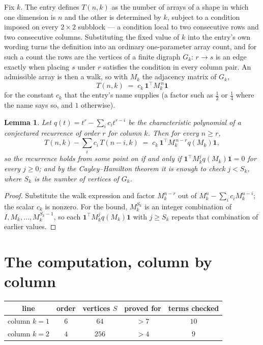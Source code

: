 \documentclass[11pt,a4paper]{article}
\theoremstyle{plain}
\newtheorem{lemma}[theorem]{Lemma}
\theoremstyle{definition}
\begin{document}
Fix $k$. The entry defines $T(n,k)$ as the number of arrays of a shape in which one dimension
is $n$ and the other is determined by $k$, subject to a condition imposed on every
$2\times2$ subblock --- a condition local to two consecutive rows and two consecutive columns.
Substituting the fixed value of $k$ into the entry's own wording turns the definition into an
ordinary one-parameter array count, and for such a count the rows are the vertices of a finite
digraph $G_k$: $r\to s$ is an edge exactly when placing $s$ under $r$ satisfies the condition
in every column pair. An admissible array is then a walk, so with $M_k$ the adjacency matrix
of $G_k$,
\[
T(n,k)\;=\;c_k\,\mathbf{1}^{\!\top}M_k^{\,n}\mathbf{1}
\]
for the constant $c_k$ that the entry's name supplies (a factor such as $\tfrac12$ or
$\tfrac14$ where the name says so, and $1$ otherwise).

\begin{lemma}\label{lem:crit}
Let $q(t)=t^{r}-\sum_i c_it^{r-i}$ be the characteristic polynomial of a conjectured
recurrence of order $r$ for column $k$. Then for every $n\ge r$,
\[
T(n,k)-\sum_i c_i\,T(n-i,k)\;=\;c_k\,\mathbf{1}^{\!\top}M_k^{\,n-r}q(M_k)\mathbf{1},
\]
so the recurrence holds from some point on if and only if
$\mathbf{1}^{\!\top}M_k^{j}q(M_k)\mathbf{1}=0$ for every $j\ge0$; and by the
Cayley--Hamilton theorem it is enough to check $j<S_k$, where $S_k$ is the number of vertices
of $G_k$.
\end{lemma}

\begin{proof}
Substitute the walk expression and factor $M_k^{n-r}$ out of $M_k^{n}-\sum_ic_iM_k^{n-i}$;
the scalar $c_k$ is nonzero. For the bound, $M_k^{S_k}$ is an integer combination of
$I,M_k,\dots,M_k^{S_k-1}$, so each $\mathbf{1}^{\!\top}M_k^{j}q(M_k)\mathbf{1}$ with
$j\ge S_k$ repeats that combination of earlier values.
\end{proof}

\section{The computation, column by column}

\begin{center}
\begin{tabular}{ccccc}
line & order & vertices $S$ & proved for & terms checked \\ \hline
column $k$$=1$ & $6$ & $64$ & $>7$ & $10$ \\
column $k$$=2$ & $4$ & $256$ & $>4$ & $9$ \\
\end{tabular}
\end{center}
\end{document}
